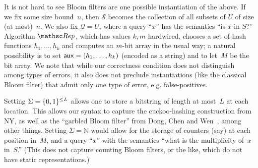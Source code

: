 It is not hard to see Bloom filters are one possible instantiation of the above. If we fix some
size bound~$n$, then $\mathcal{S}$ becomes the collection of all subsets of $U$
of size (at most)~$n$. We also fix $\mathcal{Q} = U$, where a query ``$x$'' has
the semantics ``is $x$ in $S$?'' Algorithm $\Rep$, which has values $k, m$ hardwired,
chooses a set of hash functions $h_1, \ldots, h_k$ and computes an $m$-bit
array in the usual way; a natural possibility is to set ${\sf aux} = (h_1, \ldots, h_k)$ (encoded as a string) and
to let~$M$ be the bit array.  
We note that while our correctness condition does not distinguish among types of errors, it also does not preclude instantiations (like the classical Bloom filter) that admit only one type of error, e.g. false-positives.  

Setting $\Sigma=\{0,1\}^{\leq L}$ allows one to store a bitstring of length at most~$L$ at each location.  This allows our syntax to capture the cuckoo-hashing construction from NY, as well as the ``garbled Bloom filter'' from Dong, Chen and Wen~\cite{xxx}, among other things.  Setting $\Sigma=\mathbb{N}$ would allow for the storage of counters (say) at each position in~$M$, and a query ``$x$'' with the semantics ``what is the multiplicity of~$x$ in~$S$.''  (This does not capture counting Bloom filters, or the like, which do not have static representations.)  

